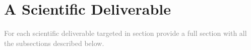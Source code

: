 \section{ A Scientific Deliverable }
\textcolor{gray}{For each scientific deliverable targeted in section provide a
full section with all the subsections described below.}

